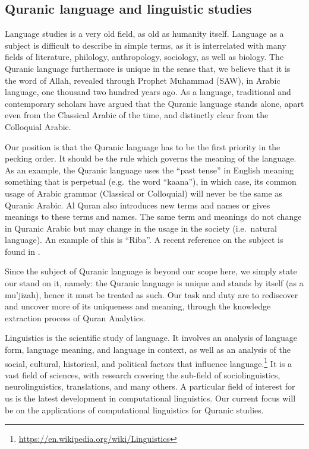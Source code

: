 \documentclass[
]{article}
\begin{document}
\hypertarget{quranic-language-and-studies}{%
\subsection{Quranic language and linguistic studies}\label{quranic-language-and-studies}}

Language studies is a very old field, as old as humanity itself. Language as a subject is difficult to describe in simple terms, as it is interrelated with many fields of literature, philology, anthropology, sociology, as well as biology. The Quranic language furthermore is unique in the sense that, we believe that it is the word of Allah, revealed through Prophet Muhammad (SAW), in Arabic language, one thousand two hundred years ago. As a language, traditional and contemporary scholars have argued that the Quranic language stands alone, apart even from the Classical Arabic of the time, and distinctly clear from the Colloquial Arabic.

Our position is that the Quranic language has to be the first priority in the pecking order. It should be the rule which governs the meaning of the language. As an example, the Quranic language uses the ``past tense'' in English meaning something that is perpetual (e.g.~the word ``kaana''), in which case, its common usage of Arabic grammar (Classical or Colloquial) will never be the same as Quranic Arabic. Al Quran also introduces new terms and names or gives meanings to these terms and names. The same term and meanings do not change in Quranic Arabic but may change in the usage in the society (i.e.~natural language). An example of this is ``Riba''. A recent reference on the subject is found in \citep{saeh2015}.

Since the subject of Quranic language is beyond our scope here, we simply state our stand on it, namely: the Quranic language is unique and stands by itself (as a mu'jizah), hence it must be treated as such. Our task and duty are to rediscover and uncover more of its uniqueness and meaning, through the knowledge extraction process of Quran Analytics.

Linguistics is the scientific study of language. It involves an analysis of language form, language meaning, and language in context, as well as an analysis of the social, cultural, historical, and political factors that influence language.\footnote{\url{https://en.wikipedia.org/wiki/Linguistics}} It is a vast field of sciences, with research covering the sub-field of sociolinguistics, neurolinguistics, translations, and many others. A particular field of interest for us is the latest development in computational linguistics. Our current focus will be on the applications of computational linguistics for Quranic studies.
\end{document}
